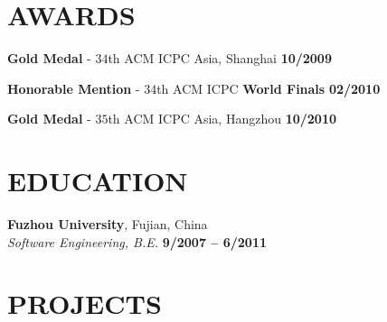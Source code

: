 \documentclass[margin,line]{resume}
\begin{document}
\begin{resume}
    
\sectionline

    \section{\mysidestyle \textbf{\large{A}\small{WARDS}}} 

	\vspace{1mm} %

	\textbf{Gold Medal} - $34$th ACM ICPC Asia, Shanghai \hfill \textbf{10/2009}\vspace{-3mm}\\\vspace{-4mm}%

	\textbf{Honorable Mention} - $34$th ACM ICPC \textbf{World Finals} \hfill \textbf{02/2010}\vspace{-3mm}\\\vspace{-4mm}%

	\textbf{Gold Medal} - $35$th ACM ICPC Asia, Hangzhou \hfill \textbf{10/2010}\vspace{-3mm}\\\vspace{-3mm}%

\sectionline

    \section{\mysidestyle \textbf{\large{E}\small{DUCATION}}}

    \textbf{Fuzhou University}, Fujian, China \vspace{2mm}\\\vspace{-0.5mm}%
    \textsl{Software Engineering, B.E.} \hfill \textbf{  9/2007 -- 6/2011}\vspace{-5mm}\\\vspace{-1mm}%


\sectionline

\iffalse
    \section{\mysidestyle \textbf{\large{P}\small{ROJECTS}}}


\end{resume}
\end{document}
